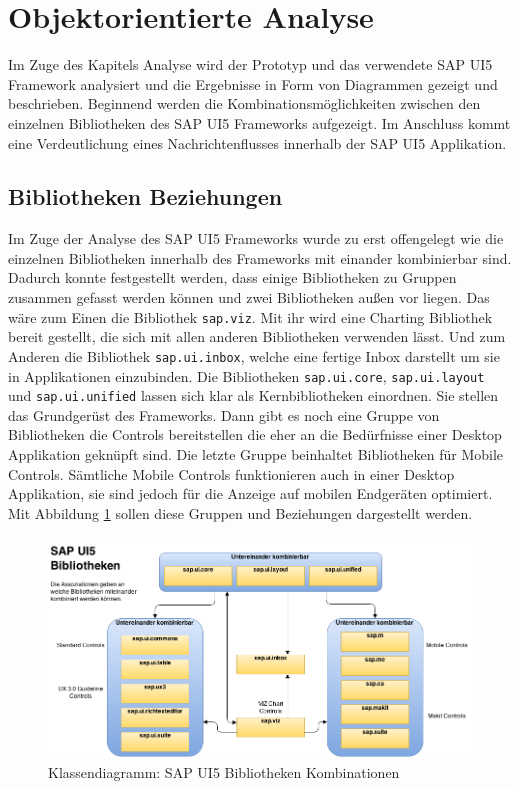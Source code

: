 \section{Objektorientierte Analyse}\label{analyse}
Im Zuge des Kapitels Analyse wird der Prototyp und das verwendete SAP UI5 Framework analysiert und die Ergebnisse in Form von Diagrammen gezeigt und beschrieben. Beginnend werden die Kombinationsmöglichkeiten zwischen den einzelnen Bibliotheken des SAP UI5 Frameworks aufgezeigt. Im Anschluss kommt eine Verdeutlichung eines Nachrichtenflusses innerhalb der SAP UI5 Applikation.

\subsection{Bibliotheken Beziehungen}
Im Zuge der Analyse des SAP UI5 Frameworks wurde zu erst offengelegt wie die einzelnen Bibliotheken innerhalb des Frameworks mit einander kombinierbar sind. Dadurch konnte festgestellt werden, dass einige Bibliotheken zu Gruppen zusammen gefasst werden können und zwei Bibliotheken außen vor liegen. Das wäre zum Einen die Bibliothek \texttt{sap.viz}. Mit ihr wird eine Charting Bibliothek bereit gestellt, die sich mit allen anderen Bibliotheken verwenden lässt. Und zum Anderen die Bibliothek \texttt{sap.ui.inbox}, welche eine fertige Inbox darstellt um sie in Applikationen einzubinden. Die Bibliotheken \texttt{sap.ui.core}, \texttt{sap.ui.layout} und \texttt{sap.ui.unified} lassen sich klar als Kernbibliotheken einordnen. Sie stellen das Grundgerüst des Frameworks. Dann gibt es noch eine Gruppe von Bibliotheken die Controls bereitstellen die eher an die Bedürfnisse einer Desktop Applikation geknüpft sind. Die letzte Gruppe beinhaltet Bibliotheken für Mobile Controls. Sämtliche Mobile Controls funktionieren auch in einer Desktop Applikation, sie sind jedoch für die Anzeige auf mobilen Endgeräten optimiert. Mit Abbildung \ref{fig:sapui5libconnections} sollen diese Gruppen und Beziehungen dargestellt werden.

\vspace{1em}
\begin{figure}[htb]
  \centering
  \includegraphics[width=0.95\linewidth]{abb/sapui5_lib_connections}
  \caption[Klassendiagramm: SAP UI5 Bibliotheken Kombinationen]{Klassendiagramm: SAP UI5 Bibliotheken Kombinationen}
  \label{fig:sapui5libconnections}
\end{figure}

